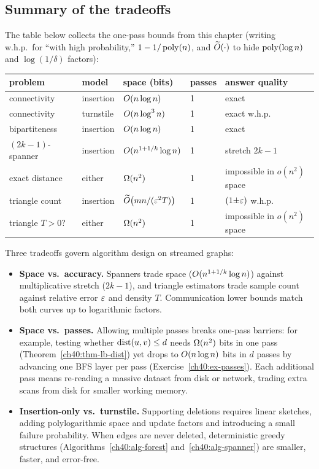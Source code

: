 \subsection{Summary of the tradeoffs}

The table below collects the one-pass bounds from this chapter (writing w.h.p.\
for ``with high probability,'' $1 - 1/\operatorname{poly}(n)$, and $\widetilde{O}(\cdot)$ to
hide $\operatorname{poly}(\log n)$ and $\log(1/\delta)$ factors):

\begin{center}
\begin{tabular}{lllll}
\toprule
problem & model & space (bits) & passes & answer quality \\
\midrule
connectivity & insertion & $O(n\log n)$ & 1 & exact \\
connectivity & turnstile & $O(n\log^3 n)$ & 1 & exact w.h.p. \\
bipartiteness & insertion & $O(n\log n)$ & 1 & exact \\
$(2k{-}1)$-spanner & insertion & $O(n^{1+1/k}\log n)$ & 1 & stretch $2k{-}1$ \\
exact distance & either & $\Omega(n^2)$ & 1 & impossible in $o(n^2)$ space \\
\addlinespace[2pt]
triangle count & insertion & $\widetilde{O}\bigl(mn/(\varepsilon^2 T)\bigr)$ & 1 & $(1{\pm}\varepsilon)$ w.h.p. \\
\addlinespace[2pt]
triangle $T>0$? & either & $\Omega(n^2)$ & 1 & impossible in $o(n^2)$ space \\
\bottomrule
\end{tabular}
\end{center}

Three tradeoffs govern algorithm design on streamed graphs:

\begin{itemize}
\item \textbf{Space vs.\ accuracy.} Spanners trade space ($O(n^{1+1/k}\log n)$)
against multiplicative stretch ($2k-1$), and triangle estimators trade sample
count against relative error $\varepsilon$ and density $T$. Communication lower bounds
match both curves up to logarithmic factors.
\item \textbf{Space vs.\ passes.} Allowing multiple passes breaks one-pass
barriers: for example, testing whether $\operatorname{dist}(u,v)\le d$ needs $\Omega(n^2)$ bits
in one pass (Theorem~\ref{ch40:thm-lb-dist}) yet drops to $O(n\log n)$ bits in
$d$ passes by advancing one BFS layer per pass (Exercise~\ref{ch40:ex-passes}). Each additional
pass means re-reading a massive dataset from disk or network, trading extra
scans from disk for smaller working memory.
\item \textbf{Insertion-only vs.\ turnstile.} Supporting deletions requires
linear sketches, adding polylogarithmic space and update factors and introducing
a small failure probability. When edges are never deleted, deterministic greedy
structures (Algorithms~\ref{ch40:alg-forest} and~\ref{ch40:alg-spanner}) are
smaller, faster, and error-free.
\end{itemize}

